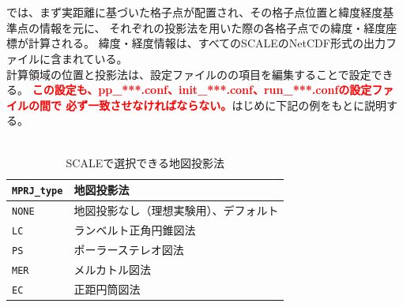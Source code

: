 \section{\SecAdvanceMapprojectionSetting} \label{subsec:adv_mapproj}
\scalerm では、まず実距離に基づいた格子点が配置され、その格子点位置と緯度経度基準点の情報を元に、
それぞれの投影法を用いた際の各格子点での緯度・経度座標が計算される。
緯度・経度情報は、すべてのSCALEのNetCDF形式の出力ファイルに含まれている。\\
計算領域の位置と投影法は、設定ファイルのの項目を編集することで設定できる。
\textcolor{red}{\bf この設定も、pp\_***.conf、init\_***.conf、run\_***.confの設定ファイルの間で
必ず一致させなければならない。}はじめに下記の例をもとに説明する。\\

\\

\begin{table}[b]
\begin{center}
\caption{SCALEで選択できる地図投影法}
\begin{tabularx}{150mm}{|l|X|} \hline
 \rowcolor[gray]{0.9} \verb|MPRJ_type| & 地図投影法 \\ \hline
 \verb|NONE| & 地図投影なし（理想実験用）、デフォルト \\ \hline
 \verb|LC|   & ランベルト正角円錐図法              \\ \hline
 \verb|PS|   & ポーラーステレオ図法                \\ \hline
 \verb|MER|  & メルカトル図法                     \\ \hline
 \verb|EC|   & 正距円筒図法                       \\ \hline
\end{tabularx}
\label{tab:map_proj}
\end{center}
\end{table}

